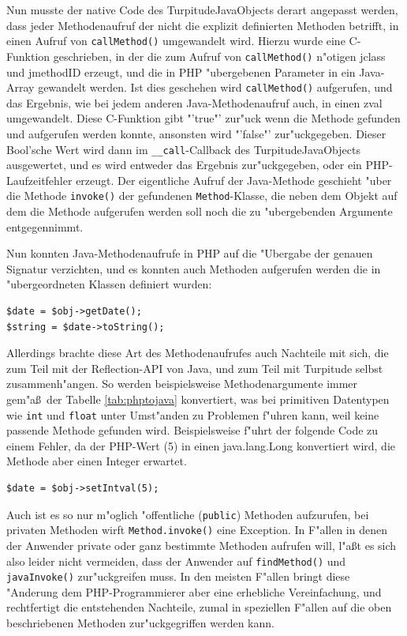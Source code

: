 Nun musste der native Code des TurpitudeJavaObjects derart angepasst werden, dass jeder Methodenaufruf der nicht die explizit
definierten Methoden betrifft, in einen Aufruf von \texttt{callMethod()} umgewandelt wird. Hierzu wurde eine C-Funktion geschrieben,
in der die zum Aufruf von \texttt{callMethod()} n"otigen jclass und jmethodID erzeugt, und die in PHP "ubergebenen Parameter
in ein Java-Array gewandelt werden. Ist dies geschehen wird \texttt{callMethod()} aufgerufen, und das Ergebnis, wie bei jedem
anderen Java-Methodenaufruf auch, in einen zval umgewandelt. Diese C-Funktion gibt "'true"' zur"uck wenn die Methode gefunden
und aufgerufen werden konnte, ansonsten wird "'false"' zur"uckgegeben. Dieser Bool'sche Wert wird dann im \texttt{\_\_call}-Callback
des TurpitudeJavaObjects ausgewertet, und es wird entweder das Ergebnis zur"uckgegeben, oder ein PHP-Laufzeitfehler erzeugt.
Der eigentliche Aufruf der Java-Methode geschieht "uber die Methode \texttt{invoke()} der gefundenen \texttt{Method}-Klasse, die neben
dem Objekt auf dem die Methode aufgerufen werden soll noch die zu "ubergebenden Argumente entgegennimmt.

Nun konnten Java-Methodenaufrufe in PHP auf die "Ubergabe der genauen Signatur verzichten, und es konnten auch Methoden aufgerufen
werden die in "ubergeordneten Klassen definiert wurden:
\clearpage
\begin{lstlisting}[caption=Verbesserter Aufruf einer Java-Methode]
$date = $obj->getDate();
$string = $date->toString();
\end{lstlisting}

Allerdings brachte diese Art des Methodenaufrufes auch Nachteile mit sich, die zum Teil mit der Reflection-API von Java,
und zum Teil mit Turpitude selbst zusammenh"angen. So werden beispielsweise Methodenargumente immer gem"a\ss\ der Tabelle
\ref{tab:phptojava} konvertiert, was bei primitiven Datentypen wie \texttt{int} und \texttt{float} unter Umst"anden zu Problemen f"uhren
kann, weil keine passende Methode gefunden wird. Beispielsweise f"uhrt der folgende Code
zu einem Fehler, da der PHP-Wert (5) in einen java.lang.Long konvertiert wird, die Methode aber einen Integer erwartet.

\begin{lstlisting}[caption=Typkonversionsfehler]
$date = $obj->setIntval(5);
\end{lstlisting}

Auch ist es so nur m"oglich "offentliche (\texttt{public}) Methoden aufzurufen,
bei privaten Methoden wirft \texttt{Method.invoke()} eine Exception.
In F"allen in denen der Anwender private oder ganz bestimmte Methoden aufrufen will, l"a\ss t es sich also leider nicht vermeiden, dass 
der Anwender auf \texttt{findMethod()} und \texttt{javaInvoke()} zur"uckgreifen muss. In den meisten F"allen bringt diese "Anderung 
dem PHP-Programmierer aber eine erhebliche Vereinfachung, und rechtfertigt die entstehenden Nachteile, zumal in speziellen F"allen
auf die oben beschriebenen Methoden zur"uckgegriffen werden kann.

